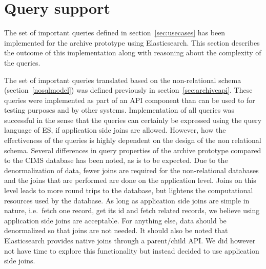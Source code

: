 
\section{Query support}

The set of important queries defined in section~\ref{sec:usecases} has been implemented for the archive prototype using Elasticsearch. This section describes the outcome of this implementation along with reasoning about the complexity of the queries.  

The set of important queries translated based on the non-relational schema (section~\ref{nosqlmodel}) was defined previously in section~\ref{sec:archiveapi}. These queries were implemented as part of an API component than can be used to for testing purposes and by other systems. Implementation of all queries was successful in the sense that the queries can certainly be expressed using the query language of ES, if application side joins are allowed. However, how the effectiveness of the queries is highly dependent on the design of the non relational schema. Several differences in query properties of the archive prototype compared to the CIMS database has been noted, as is to be expected. Due to the denormalization of data, fewer joins are required for the non-relational databases and the joins that are performed are done on the application level. Joins on this level leads to more round trips to the database, but lightens the computational resources used by the database. As long as application side joins are simple in nature, i.e.\ fetch one record, get its id and fetch related records, we believe using application side joins are acceptable. For anything else, data should be denormalized so that joins are not needed. It should also be noted that Elasticsearch provides native joins through a parent/child API. We did however not have time to explore this functionality but instead decided to use application side joins.



%

